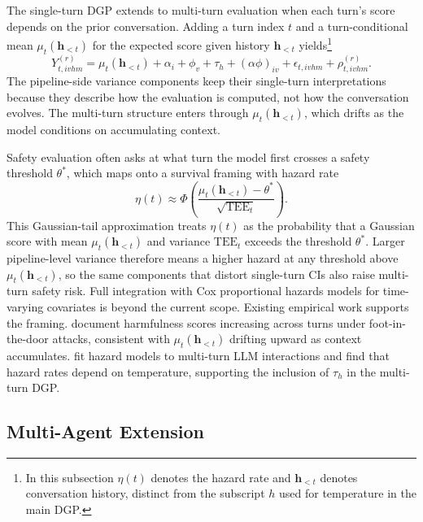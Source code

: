 The single-turn DGP extends to multi-turn evaluation when each turn's score depends on the prior conversation. Adding a turn index $t$ and a turn-conditional mean $\mu_t(\mathbf{h}_{<t})$ for the expected score given history $\mathbf{h}_{<t}$ yields\footnote{In this subsection $\eta(t)$ denotes the hazard rate and $\mathbf{h}_{<t}$ denotes conversation history, distinct from the subscript $h$ used for temperature in the main DGP.}
\begin{equation}
Y_{t,ivhm}^{(r)} = \mu_t(\mathbf{h}_{<t}) + \alpha_i + \phi_v + \tau_h + (\alpha\phi)_{iv} + \epsilon_{t,ivhm} + \rho_{t,ivhm}^{(r)}.
\end{equation}
The pipeline-side variance components keep their single-turn interpretations because they describe how the evaluation is computed, not how the conversation evolves. The multi-turn structure enters through $\mu_t(\mathbf{h}_{<t})$, which drifts as the model conditions on accumulating context.

Safety evaluation often asks at what turn the model first crosses a safety threshold $\theta^*$, which maps onto a survival framing with hazard rate
\begin{equation}
\eta(t) \approx \Phi\!\left(\frac{\mu_t(\mathbf{h}_{<t}) - \theta^*}{\sqrt{\text{TEE}_t}}\right).
\end{equation}
This Gaussian-tail approximation treats $\eta(t)$ as the probability that a Gaussian score with mean $\mu_t(\mathbf{h}_{<t})$ and variance $\text{TEE}_t$ exceeds the threshold $\theta^*$. Larger pipeline-level variance therefore means a higher hazard at any threshold above $\mu_t(\mathbf{h}_{<t})$, so the same components that distort single-turn CIs also raise multi-turn safety risk. Full integration with Cox proportional hazards models \citep{cox1972regression} for time-varying covariates is beyond the current scope. Existing empirical work supports the framing. \citet{weng2025footinthedoor} document harmfulness scores increasing across turns under foot-in-the-door attacks, consistent with $\mu_t(\mathbf{h}_{<t})$ drifting upward as context accumulates. \citet{li2025timetoincon} fit hazard models to multi-turn LLM interactions and find that hazard rates depend on temperature, supporting the inclusion of $\tau_h$ in the multi-turn DGP.

\subsection{Multi-Agent Extension}


